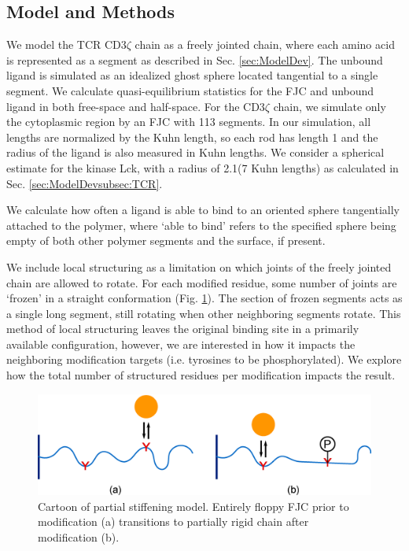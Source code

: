 \documentclass[../../AdvancementSummary.tex]{subfiles}
\begin{document}
\subsection{Model and Methods}

We model the TCR CD3$\zeta$ chain as a freely jointed chain, where each amino acid is represented as a segment as described in Sec. \ref{sec:ModelDev}. The unbound ligand is simulated as an idealized ghost sphere located tangential to a single segment. We calculate quasi-equilibrium statistics for the FJC and unbound ligand in both free-space and half-space. For the CD3$\zeta$ chain, we simulate only the cytoplasmic region by an FJC with 113 segments. In our simulation, all lengths are normalized by the Kuhn length, so each rod has length 1 and the radius of the ligand is also measured in Kuhn lengths. We consider a spherical estimate for the kinase Lck, with a radius of 2.1\nm (7 Kuhn lengths) as calculated in Sec. \ref{sec:ModelDevsubsec:TCR}.

We calculate how often a ligand is able to bind to an oriented sphere tangentially attached to the polymer, where `able to bind' refers to the specified sphere being empty of both other polymer segments and the surface, if present. 

We include local structuring as a limitation on which joints of the freely jointed chain are allowed to rotate. For each modified residue, some number of joints are `frozen' in a straight conformation (Fig. \ref{fig: StiffeningCartoon}). The section of frozen segments acts as a single long segment, still rotating when other neighboring segments rotate. This method of local structuring leaves the original binding site in a primarily available configuration, however, we are interested in how it impacts the neighboring modification targets (i.e. tyrosines to be phosphorylated). We explore how the total number of structured residues per modification impacts the result. 

\begin{figure}[H]
\begin{center}
    \includegraphics[width=0.8\linewidth]{ResultsFigures/StiffeningDiagram/StiffeningDiagram.eps}
    \caption{Cartoon of partial stiffening model. Entirely floppy FJC prior to modification (a) transitions to partially rigid chain after modification (b). \label{fig: StiffeningCartoon}}
    \end{center}
\end{figure}
\end{document}
